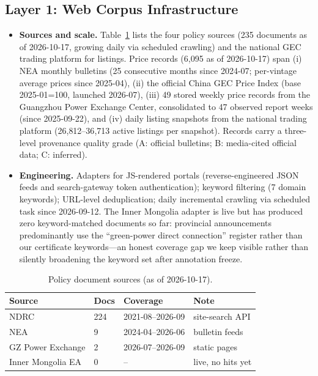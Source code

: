 \documentclass[sigconf,anonymous,review]{acmart}
\begin{document}
\subsection{Layer 1: Web Corpus Infrastructure}
\begin{itemize}
  \item \textbf{Sources and scale.} Table~\ref{tab:sources} lists the four policy sources (235 documents as of 2026-10-17, growing daily via scheduled crawling) and the national GEC trading platform for listings. Price records (6{,}095 as of 2026-10-17) span (i) NEA monthly bulletins (25 consecutive months since 2024-07; per-vintage average prices since 2025-04), (ii) the official China GEC Price Index (base 2025-01=100, launched 2026-07), (iii) 49 stored weekly price records from the Guangzhou Power Exchange Center, consolidated to 47 observed report weeks (since 2025-09-22), and (iv) daily listing snapshots from the national trading platform (26{,}812--36{,}713 active listings per snapshot). Records carry a three-level provenance quality grade (A: official bulletins; B: media-cited official data; C: inferred).
  \item \textbf{Engineering.} Adapters for JS-rendered portals (reverse-engineered JSON feeds and search-gateway token authentication); keyword filtering (7 domain keywords); URL-level deduplication; daily incremental crawling via scheduled task since 2026-09-12. The Inner Mongolia adapter is live but has produced zero keyword-matched documents so far: provincial announcements predominantly use the ``green-power direct connection'' register rather than our certificate keywords---an honest coverage gap we keep visible rather than silently broadening the keyword set after annotation freeze.
\end{itemize}

\begin{table}[t]
  \centering
  \small
  \setlength{\tabcolsep}{4pt}
  \caption{Policy document sources (as of 2026-10-17).}
  \label{tab:sources}
  \begin{tabular}{llll}
    \toprule
    Source & Docs & Coverage & Note \\
    \midrule
    NDRC & 224 & 2021-08--2026-09 & site-search API \\
    NEA & 9 & 2024-04--2026-06 & bulletin feeds \\
    GZ Power Exchange & 2 & 2026-07--2026-09 & static pages \\
    Inner Mongolia EA & 0 & -- & live, no hits yet \\
    \bottomrule
  \end{tabular}
\end{table}
\end{document}
